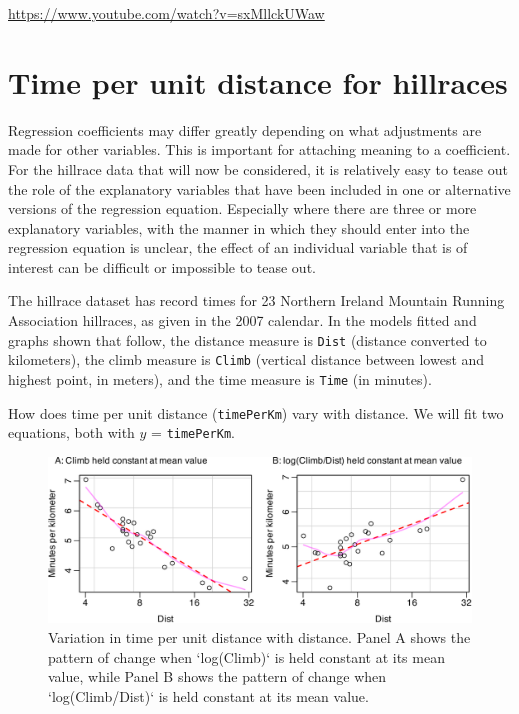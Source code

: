 \documentclass[
  10pt,
  b5paper]{book}
\begin{document}
\url{https://www.youtube.com/watch?v=sxMllckUWaw}

\hypertarget{time-per-unit-distance-for-hillraces}{%
\section{Time per unit distance for hillraces}\label{time-per-unit-distance-for-hillraces}}

Regression coefficients may differ greatly depending on what
adjustments are made for other variables. This is important
for attaching meaning to a coefficient. For the hillrace
data that will now be considered, it is relatively easy to
tease out the role of the explanatory variables that have
been included in one or alternative versions of the regression
equation. Especially where there are three or more explanatory
variables, with the manner in which they should enter into the
regression equation is unclear, the effect of an individual
variable that is of interest can be difficult or impossible
to tease out.

The hillrace dataset has record times for 23 Northern Ireland
Mountain Running Association hillraces, as given in the 2007
calendar. In the models fitted and graphs shown that follow,
the distance measure is \texttt{Dist} (distance converted to kilometers),
the climb measure is \texttt{Climb} (vertical distance between lowest
and highest point, in meters), and the time measure is \texttt{Time}
(in minutes).

How does time per unit distance (\texttt{timePerKm}) vary with distance.
We will fit two equations, both with \(y\) = \texttt{timePerKm}.

\begin{figure}[H]

{\centering \includegraphics[width=1\linewidth]{07-regress_files/figure-latex/partial-1} 

}

\caption{Variation in time per unit distance with distance.  Panel A
shows the pattern of change when `log(Climb)` is held constant at its 
mean value, while Panel B shows the pattern of change when 
`log(Climb/Dist)` is held constant at its mean value.}\label{fig:partial}
\end{figure}
\end{document}
